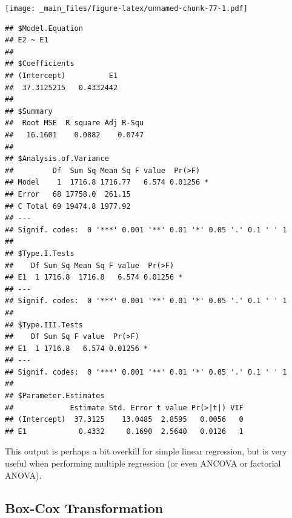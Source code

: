 \documentclass[
]{book}
\newenvironment{Shaded}{\begin{snugshade}}{\end{snugshade}}
\newcommand{\AttributeTok}[1]{\textcolor[rgb]{0.77,0.63,0.00}{#1}}
\newcommand{\DecValTok}[1]{\textcolor[rgb]{0.00,0.00,0.81}{#1}}
\newcommand{\FunctionTok}[1]{\textcolor[rgb]{0.00,0.00,0.00}{#1}}
\newcommand{\NormalTok}[1]{#1}
\newcommand{\SpecialCharTok}[1]{\textcolor[rgb]{0.00,0.00,0.00}{#1}}
\begin{document}
\begin{Shaded}
\end{Shaded}

\texttt{[image: \_main\_files/figure-latex/unnamed-chunk-77-1.pdf]}

\begin{verbatim}
## $Model.Equation
## E2 ~ E1
## 
## $Coefficients
## (Intercept)          E1 
##  37.3125215   0.4332442 
## 
## $Summary
##  Root MSE  R square Adj R-Squ 
##   16.1601    0.0882    0.0747 
## 
## $Analysis.of.Variance
##         Df  Sum Sq Mean Sq F value  Pr(>F)  
## Model    1  1716.8 1716.77   6.574 0.01256 *
## Error   68 17758.0  261.15                  
## C Total 69 19474.8 1977.92                  
## ---
## Signif. codes:  0 '***' 0.001 '**' 0.01 '*' 0.05 '.' 0.1 ' ' 1
## 
## $Type.I.Tests
##    Df Sum Sq Mean Sq F value  Pr(>F)  
## E1  1 1716.8  1716.8   6.574 0.01256 *
## ---
## Signif. codes:  0 '***' 0.001 '**' 0.01 '*' 0.05 '.' 0.1 ' ' 1
## 
## $Type.III.Tests
##    Df Sum Sq F value  Pr(>F)  
## E1  1 1716.8   6.574 0.01256 *
## ---
## Signif. codes:  0 '***' 0.001 '**' 0.01 '*' 0.05 '.' 0.1 ' ' 1
## 
## $Parameter.Estimates
##             Estimate Std. Error t value Pr(>|t|) VIF
## (Intercept)  37.3125    13.0485  2.8595   0.0056   0
## E1            0.4332     0.1690  2.5640   0.0126   1
\end{verbatim}

This output is perhaps a bit overkill for simple linear regression, but is very useful when performing multiple regression (or even ANCOVA or factorial ANOVA).

\hypertarget{box-cox-transformation}{%
\subsection{Box-Cox Transformation}\label{box-cox-transformation}}
\end{document}
